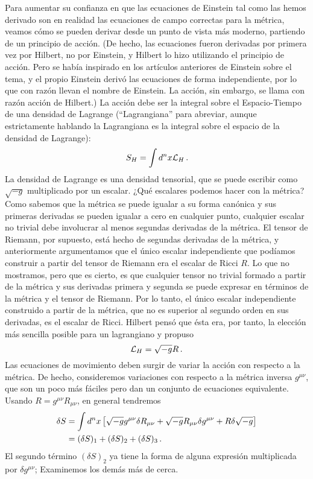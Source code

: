 \documentclass[11pt,b5paper,openany,twoside]{book}
\newcommand{\mn}{{\mu\nu}}
\def\g{{\sqrt{-g}}}
\begin{document}
Para aumentar su confianza en que las ecuaciones de Einstein tal como las hemos derivado son en realidad las ecuaciones de campo correctas para la métrica, veamos cómo se pueden derivar desde un punto de vista más moderno, partiendo de un principio de acción.
(De hecho, las ecuaciones fueron derivadas por primera vez por Hilbert, no por Einstein, y Hilbert lo hizo utilizando el principio de acción.
Pero se había inspirado en los artículos anteriores de Einstein sobre el tema, y el propio Einstein derivó las ecuaciones de forma independiente, por lo que con razón llevan el nombre de Einstein.
La acción, sin embargo, se llama con razón acción de Hilbert.)
La acción debe ser la integral sobre el Espacio-Tiempo de una densidad de Lagrange (``Lagrangiana'' para abreviar, aunque estrictamente hablando la Lagrangiana es la integral sobre el espacio de la densidad de Lagrange):
\begin{equation}
S_H=\int d^nx {\cal L}_H\,.\label{4.54}
\end{equation}
La densidad de Lagrange es una densidad tensorial, que se puede escribir como $\g$ multiplicado por un escalar.
¿Qué escalares podemos hacer con la métrica?
Como sabemos que la métrica se puede igualar a su forma canónica y sus primeras derivadas se pueden igualar a cero en cualquier punto, cualquier escalar no trivial debe involucrar al menos segundas derivadas de la métrica.
El tensor de Riemann, por supuesto, está hecho de segundas derivadas de la métrica, y anteriormente argumentamos que el único escalar independiente que podíamos construir a partir del tensor de Riemann era el escalar de Ricci $R$.
Lo que no mostramos, pero que es cierto, es que cualquier tensor no trivial formado a partir de la métrica y sus derivadas primera y segunda se puede expresar en términos de la métrica y el tensor de Riemann.
Por lo tanto, el único escalar independiente construido a partir de la métrica, que no es superior al segundo orden en sus derivadas, es el escalar de Ricci.
Hilbert pensó que ésta era, por tanto, la elección más sencilla posible para un lagrangiano y propuso
\begin{equation}
{\cal L}_H = \g R\,.\label{4.55}
\end{equation}
Las ecuaciones de movimiento deben surgir de variar la acción con respecto a la métrica.
De hecho, consideremos variaciones con respecto a la métrica inversa $g^\mn$, que son un poco más fáciles pero dan un conjunto de ecuaciones equivalente.
Usando $R=g^\mn R_\mn$, en general tendremos
\begin{align}
\delta S  &=  \int d^nx\left[\g g^\mn \delta R_\mn + \g R_\mn \delta
g^\mn+ R\delta\g\right] \notag \\
&=  (\delta S)_1 +(\delta S)_2 +(\delta S)_3 \,. \label{4.56}
\end{align}
El segundo término $(\delta S)_2$ ya tiene la forma de alguna expresión multiplicada por $\delta g^\mn$; Examinemos los demás más de cerca.
\end{document}
